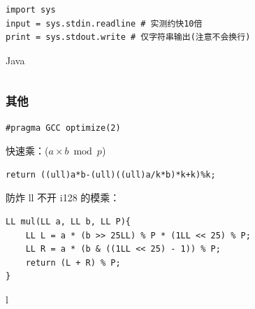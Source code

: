 \documentclass[twocolumn,10pt]{ctexart}
\begin{document}
\begin{verbatim}
import sys
input = sys.stdin.readline # 实测约快10倍
print = sys.stdout.write # 仅字符串输出(注意不会换行)
\end{verbatim}

Java

\inputminted{java}{code/ext_083.java}

\subsubsection{其他}

\begin{verbatim}
#pragma GCC optimize(2)
\end{verbatim}

快速乘：($a\times b\bmod p$)

\begin{verbatim}
return ((ull)a*b-(ull)((ull)a/k*b)*k+k)%k; 
\end{verbatim}

防炸 ll 不开 i128 的模乘：

\begin{verbatim}
LL mul(LL a, LL b, LL P){
    LL L = a * (b >> 25LL) % P * (1LL << 25) % P;
    LL R = a * (b & ((1LL << 25) - 1)) % P;
    return (L + R) % P;
}
\end{verbatim}

l
\end{document}
